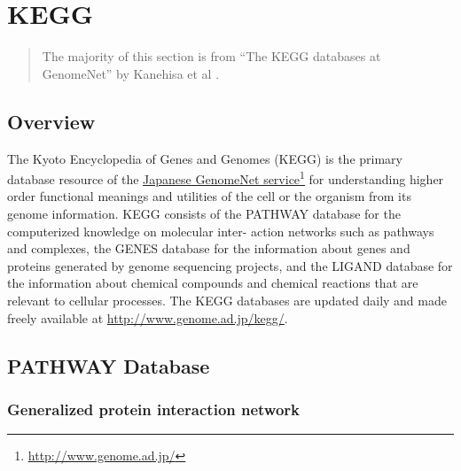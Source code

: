 \section{KEGG}
\label{sect:background_kegg}

\begin{verse}
    The majority of this section is from ``The KEGG databases at GenomeNet'' by
    Kanehisa et al \cite{kegg-basic}.
\end{verse}

\subsection{Overview}
\label{sect:background_kegg_overview}

The Kyoto Encyclopedia of Genes and Genomes (KEGG) is the primary database
resource of the \href{http://www.genome.ad.jp/}{Japanese GenomeNet
service}\footnote{\url{http://www.genome.ad.jp/}} for understanding higher order
functional meanings and utilities of the cell or the organism from its genome
information. KEGG consists of the PATHWAY database for the computerized
knowledge on molecular inter- action networks such as pathways and complexes,
the GENES database for the information about genes and proteins generated by
genome sequencing projects, and the LIGAND database for the information about
chemical compounds and chemical reactions that are relevant to cellular
processes. The KEGG databases are updated daily and made freely available at
\url{http://www.genome.ad.jp/kegg/}.

\subsection{PATHWAY Database}
\label{sect:background_kegg_pathway_database}

\subsubsection{Generalized protein interaction network}

